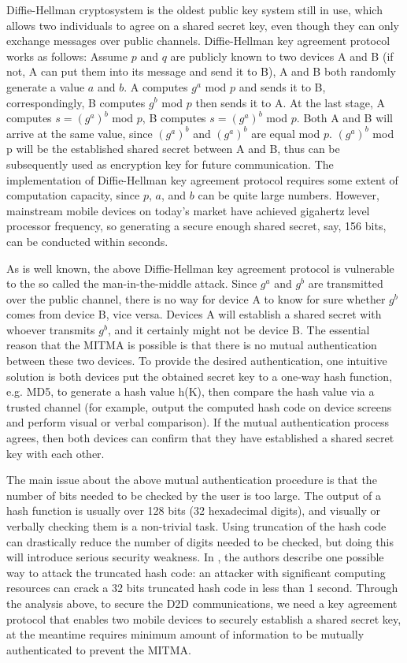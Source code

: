 \documentclass[conference]{IEEEtran}
\begin{document}
Diffie-Hellman cryptosystem is the oldest public key system still in use, which allows two individuals to agree on a shared secret key, even though they can only exchange messages over public channels. Diffie-Hellman key agreement protocol works as follows: Assume $p$ and $q$ are publicly known to two devices A and B (if not, A can put them into its message and send it to B), A and B both randomly generate a value $a$ and $b$. A computes $g^a$ mod $p$ and sends it to B, correspondingly, B computes $g^b$ mod $p$ then sends it to A. At the last stage, A computes $s=(g^a)^b$ mod $p$, B computes $s=(g^a)^b$ mod $p$. Both A and B will arrive at the same value, since $(g^a)^b$ and $(g^a)^b$ are equal mod $p$. $(g^a)^b$ mod p will be the established shared secret between A and B, thus can be subsequently used as encryption key for future communication. The implementation of Diffie-Hellman key agreement protocol requires some extent of computation capacity, since $p$, $a$, and $b$ can be quite large numbers. However, mainstream mobile devices on today's market have achieved gigahertz level processor frequency, so generating a secure enough shared secret, say, 156 bits, can be conducted within seconds.

As is well known, the above Diffie-Hellman key agreement protocol is vulnerable to the so called the man-in-the-middle attack. Since $g^a$ and $g^b$ are transmitted over the public channel, there is no way for device A to know for sure whether $g^b$ comes from device B, vice versa. Devices A will establish a shared secret with whoever transmits $g^b$, and it certainly might not be device B. The essential reason that the MITMA is possible is that there is no mutual authentication between these two devices. To provide the desired authentication, one intuitive solution is both devices put the obtained secret key to a one-way hash function, e.g. MD5, to generate a hash value h(K), then compare the hash value via a trusted channel (for example, output the computed hash code on device screens and perform visual or verbal comparison). If the mutual authentication process agrees, then both devices can confirm that they have established a shared secret key with each other.

The main issue about the above mutual authentication procedure is that the number of bits needed to be checked by the user is too large. The output of a hash function is usually over 128 bits (32 hexadecimal digits), and visually or verbally checking them is a non-trivial task. Using truncation of the hash code can drastically reduce the number of digits needed to be checked, but doing this will introduce serious security weakness. In \cite{mana}, the authors describe one possible way to attack the truncated hash code: an attacker with significant computing resources can crack a 32 bits truncated hash code in less than 1 second.
Through the analysis above, to secure the D2D communications, we need a key agreement protocol that enables two mobile devices to securely establish a shared secret key, at the meantime requires minimum amount of information to be mutually authenticated to prevent the MITMA.
\end{document}

